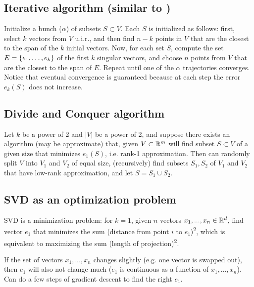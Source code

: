 \documentclass{article}
\begin{document}
\subsection{Iterative algorithm (similar to \cite{rousseeuw1999fast})}
Initialize a bunch ($\alpha$) of subsets $S\subset V$. Each $S$ is initialized as follows: first, select $k$ vectors from $V$ u.i.r., and then find $n-k$ points in $V$ that are the closest to the span of the $k$ initial vectors. Now, for each set $S$, compute the set $E = \left\{e_1,\dots, e_k\right\}$ of the first $k$ singular vectors, and choose $n$ points from $V$ that are the closest to the span of $E$. Repeat until one of the $\alpha$ trajectories converges. Notice that eventual convergence is guaranteed because at each step the error $e_k(S)$ does not increase.

\subsection{Divide and Conquer algorithm}
Let $k$ be a power of 2 and $|V|$ be a power of 2, and suppose there exists an algorithm (may be approximate) that, given $V\subset \mathbb{R}^m$ will find subset $S\subset V$ of a given size that minimizes $e_1(S)$, i.e. rank-1 approximation. Then can randomly split $V$ into $V_1$ and $V_2$ of equal size, (recursively) find subsets $S_1,S_2$ of $V_1$ and $V_2$ that have low-rank approximation, and let $S = S_1\cup S_2$.

\subsection{SVD as an optimization problem}
SVD is a minimization problem: for $k=1$, given $n$ vectors $x_1,...,x_n\in \mathbb{R}^d$, find vector $e_1$ that minimizes the sum (distance from point $i$ to $e_1$)\textsuperscript{2}, which is equivalent to maximizing the sum (length of projection)\textsuperscript{2}.

If the set of vectors $x_1,...,x_n$ changes slightly (e.g. one vector is swapped out), then $e_1$ will also not change much ($e_1$ is continuous as a function of $x_1,...,x_n$). Can do a few steps of gradient descent to find the right $e_1$.
\end{document}
